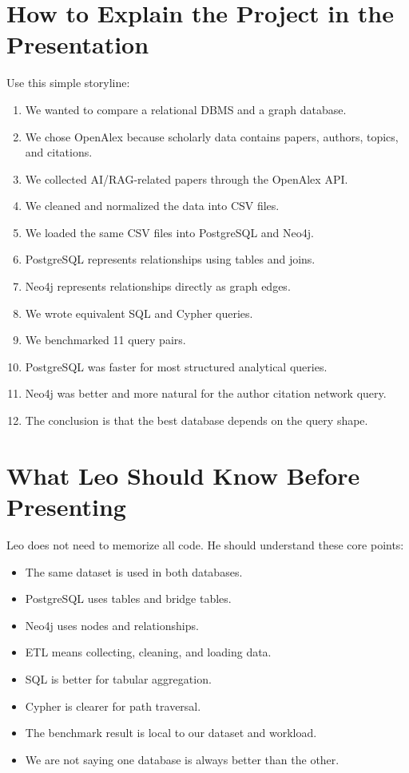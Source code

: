 \documentclass[11pt]{article}
\begin{document}
\section{How to Explain the Project in the Presentation}

Use this simple storyline:

\begin{enumerate}
    \item We wanted to compare a relational DBMS and a graph database.
    \item We chose OpenAlex because scholarly data contains papers, authors, topics, and citations.
    \item We collected AI/RAG-related papers through the OpenAlex API.
    \item We cleaned and normalized the data into CSV files.
    \item We loaded the same CSV files into PostgreSQL and Neo4j.
    \item PostgreSQL represents relationships using tables and joins.
    \item Neo4j represents relationships directly as graph edges.
    \item We wrote equivalent SQL and Cypher queries.
    \item We benchmarked 11 query pairs.
    \item PostgreSQL was faster for most structured analytical queries.
    \item Neo4j was better and more natural for the author citation network query.
    \item The conclusion is that the best database depends on the query shape.
\end{enumerate}

\section{What Leo Should Know Before Presenting}

Leo does not need to memorize all code.
He should understand these core points:

\begin{itemize}
    \item The same dataset is used in both databases.
    \item PostgreSQL uses tables and bridge tables.
    \item Neo4j uses nodes and relationships.
    \item ETL means collecting, cleaning, and loading data.
    \item SQL is better for tabular aggregation.
    \item Cypher is clearer for path traversal.
    \item The benchmark result is local to our dataset and workload.
    \item We are not saying one database is always better than the other.
\end{itemize}
\end{document}
